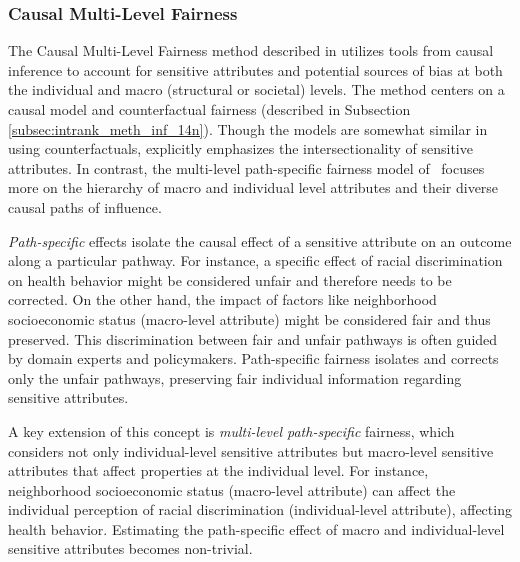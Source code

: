 \subsubsection{Causal Multi-Level Fairness}
\label{subsec:intrank_meth_inf_15n}

The Causal Multi-Level Fairness method described in \cite{mhasawade2021causal} utilizes tools from causal inference to account for sensitive attributes and potential sources of bias at both the individual and macro (structural or societal) levels.
The method centers on a causal model and counterfactual fairness (described in Subsection \ref{subsec:intrank_meth_inf_14n}). Though the models are somewhat similar in using counterfactuals, \cite{yang2020causal} explicitly emphasizes the intersectionality of sensitive attributes.
In contrast, the multi-level path-specific fairness model of~\cite{mhasawade2021causal} focuses more on the hierarchy of macro and individual level attributes and their diverse causal paths of influence.

\emph{Path-specific} effects isolate the causal effect of a sensitive attribute on an outcome along a particular pathway. For instance, a specific effect of racial discrimination on health behavior might be considered unfair and therefore needs to be corrected.
On the other hand, the impact of factors like neighborhood socioeconomic status (macro-level attribute) might be considered fair and thus preserved. This discrimination between fair and unfair pathways is often guided by domain experts and policymakers.
Path-specific fairness isolates and corrects only the unfair pathways, preserving fair individual information regarding sensitive attributes.

A key extension of this concept is \emph{multi-level path-specific} fairness, which considers not only individual-level sensitive attributes but macro-level sensitive attributes that affect properties at the individual level. For instance, neighborhood socioeconomic status (macro-level attribute) can affect the individual perception of racial discrimination (individual-level attribute), affecting health behavior. Estimating the path-specific effect of macro and individual-level sensitive attributes becomes non-trivial.


